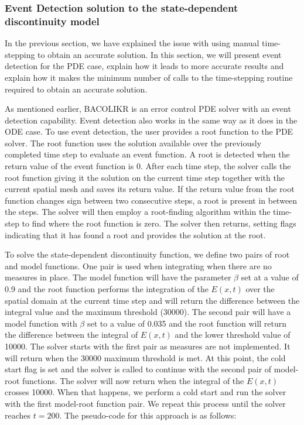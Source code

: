 \documentclass{article}
\begin{document}
\subsubsection{Event Detection solution to the state-dependent discontinuity model}
\label{subsubsection:pde_state_event_detection}
In the previous section, we have explained the issue with using manual time-stepping to obtain an accurate solution. In this section, we will present event detection for the PDE case, explain how it leads to more accurate results and explain how it makes the minimum number of calls to the time-stepping routine required to obtain an accurate solution.

As mentioned earlier, BACOLIKR is an error control PDE solver with an event detection capability. Event detection also works in the same way as it does in the ODE case. To use event detection, the user provides a root function to the PDE solver. The root function uses the solution available over the previously completed time step to evaluate an event function. A root is detected when the return value of the event function is 0. After each time step, the solver calls the root function giving it the solution on the current time step together with the current spatial mesh and saves its return value. If the return value from the root function changes sign between two consecutive steps, a root is present in between the steps. The solver will then employ a root-finding algorithm within the time-step to find where the root function is zero. The solver then returns, setting flags indicating that it has found a root and provides the solution at the root. 

To solve the state-dependent discontinuity function, we define two pairs of root and model functions. One pair is used when integrating when there are no measures in place. The model function will have the parameter $\beta$ set at a value of 0.9 and the root function performs the integration of the $E(x, t)$ over the spatial domain at the current time step and will return the difference between the integral value and the maximum threshold (30000). The second pair will have a model function with $\beta$ set to a value of 0.035 and the root function will return the difference between the integral of $E(x, t)$ and the lower threshold value of 10000. The solver starts with the first pair as measures are not implemented. It will return when the 30000 maximum threshold is met. At this point, the cold start flag is set and the solver is called to continue with the second pair of model-root functions. The solver will now return when the integral of the $E(x, t)$ crosses 10000. When that happens, we perform a cold start and run the solver with the first model-root function pair. We repeat this process until the solver reaches $t=200$. The pseudo-code for this approach is as follows:
\end{document}
